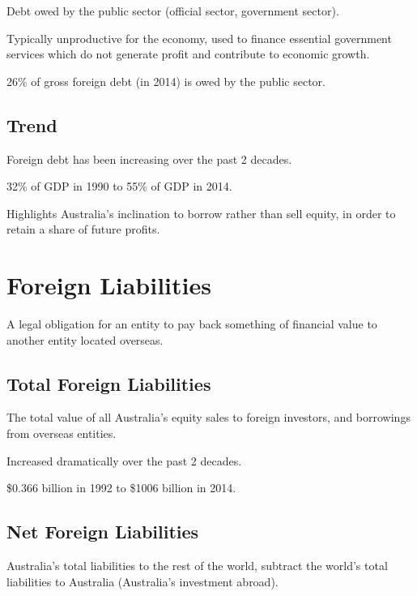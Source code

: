 \documentclass[a4paper,11pt]{article}
\begin{document}
Debt owed by the public sector (official sector, government sector).

Typically unproductive for the economy, used to finance essential government
services which do not generate profit and contribute to economic growth.

26\% of gross foreign debt (in 2014) is owed by the public sector.


\subsection{Trend}

Foreign debt has been increasing over the past 2 decades.

32\% of GDP in 1990 to 55\% of GDP in 2014.

Highlights Australia's inclination to borrow rather than sell equity, in order
to retain a share of future profits.




\section{Foreign Liabilities}

A legal obligation for an entity to pay back something of financial value to
another entity located overseas.


\subsection{Total Foreign Liabilities}

The total value of all Australia's equity sales to foreign investors, and
borrowings from overseas entities.

Increased dramatically over the past 2 decades.

\$0.366 billion in 1992 to \$1006 billion in 2014.


\subsection{Net Foreign Liabilities}

Australia's total liabilities to the rest of the world, subtract the world's
total liabilities to Australia (Australia's investment abroad).
\end{document}
